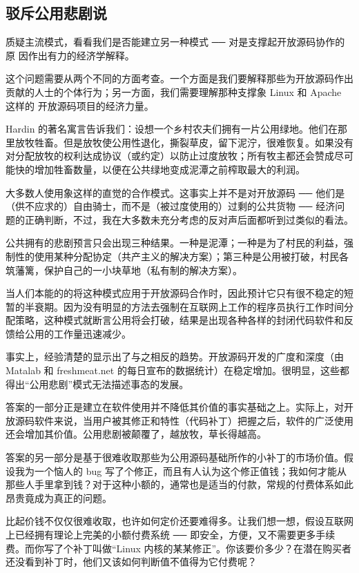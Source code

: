\subsection{驳斥公用悲剧说}
质疑主流模式，看看我们是否能建立另一种模式 ── 对是支撑起开放源码协作的原 因作出有力的经济学解释。


这个问题需要从两个不同的方面考查。一个方面是我们要解释那些为开放源码作出 贡献的人士的个体行为；另一方面，我们需要理解那种支撑象 Linux 和 Apache 这样的 开放源码项目的经济力量。


Hardin 的著名寓言告诉我们：设想一个乡村农夫们拥有一片公用绿地。他们在那里放牧牲畜。但是放牧使公用性退化，撕裂草皮，留下泥泞，很难恢复。如果没有对分配放牧的权利达成协议（或约定）以防止过度放牧；所有牧主都还会赞成尽可能快的增加牲畜数量，以便在公共绿地变成泥潭之前榨取最大的利润。


大多数人使用象这样的直觉的合作模式。这事实上并不是对开放源码 ── 他们是（供不应求的）自由骑士，而不是（被过度使用的）过剩的公共货物 ── 经济问题的正确判断，不过，我在大多数未充分考虑的反对声后面都听到过类似的看法。


公共拥有的悲剧预言只会出现三种结果。一种是泥潭；一种是为了村民的利益，强制性的使用某种分配协定（共产主义的解决方案）；第三种是公用被打破，村民各筑藩篱，保护自己的一小块草地（私有制的解决方案）。


当人们本能的的将这种模式应用于开放源码合作时，因此预计它只有很不稳定的短暂的半衰期。因为没有明显的方法去强制在互联网上工作的程序员执行工作时间分配策略，这种模式就断言公用将会打破，结果是出现各种各样的封闭代码软件和反馈给公用的工作量迅速减少。


事实上，经验清楚的显示出了与之相反的趋势。开放源码开发的广度和深度（由 Matalab 和 freshmeat.net 的每日宣布的数据统计）在稳定增加。很明显，这些都得出“公用悲剧”模式无法描述事态的发展。


答案的一部分正是建立在软件使用并不降低其价值的事实基础之上。实际上，对开放源码软件来说，当用户被其修正和特性（代码补丁）把握之后，软件的广泛使用还会增加其价值。公用悲剧被颠覆了，越放牧，草长得越高。


答案的另一部分是基于很难收取那些为公用源码基础所作的小补丁的市场价值。假设我为一个恼人的 bug 写了个修正，而且有人认为这个修正值钱；我如何才能从那些人手里拿到钱？对于这种小额的，通常也是适当的付款，常规的付费体系如此昂贵竟成为真正的问题。


比起价钱不仅仅很难收取，也许如何定价还要难得多。让我们想一想，假设互联网上已经拥有理论上完美的小额付费系统 ── 即安全，方便，又不需要更多手续费。而你写了个补丁叫做“Linux 内核的某某修正”。你该要价多少？在潜在购买者还没看到补丁时，他们又该如何判断值不值得为它付费呢？


